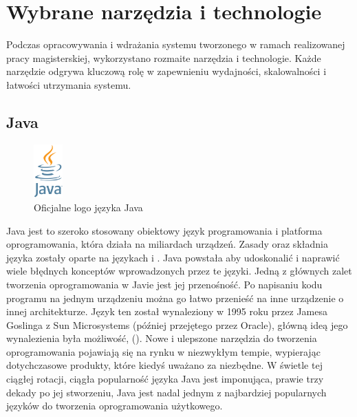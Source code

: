 \chapter{Wybrane narzędzia i technologie}


Podczas opracowywania i wdrażania systemu tworzonego w ramach realizowanej pracy magisterskiej,  wykorzystano rozmaite narzędzia i technologie. Każde narzędzie odgrywa kluczową rolę w zapewnieniu wydajności, skalowalności i łatwości utrzymania systemu.

\section{Java}

\begin{figure}[!htbp]
    \centering
    \includegraphics[width=0.1\textwidth]{images/javaLogo.png}
    \caption{Oficjalne logo języka Java}
    \label{fig:enter-label}
\end{figure}

Java jest to szeroko stosowany obiektowy język programowania i platforma oprogramowania, która działa na miliardach urządzeń. Zasady oraz składnia języka zostały oparte na językach  i \cite{javaIBM}\cite{cstandard}\cite{cppstandard}. Java powstała aby udoskonalić i naprawić wiele błędnych konceptów wprowadzonych przez te języki. Jedną z głównych zalet tworzenia oprogramowania w Javie jest jej przenośność. Po napisaniu kodu programu na jednym urządzeniu można go łatwo przenieść na inne urządzenie o innej architekturze. Język ten został wynaleziony w 1995 roku przez Jamesa Goslinga z Sun Microsystems (później przejętego przez Oracle), główną ideą jego wynalezienia była możliwość,   (). Nowe i ulepszone narzędzia do tworzenia oprogramowania pojawiają się na rynku w niezwykłym tempie, wypierając dotychczasowe produkty, które kiedyś uważano za niezbędne. W świetle tej ciągłej rotacji, ciągła popularność języka Java jest imponująca, prawie trzy dekady po jej stworzeniu, Java jest nadal jednym z najbardziej popularnych języków do tworzenia oprogramowania użytkowego\cite{javaIBM}\cite{javaDEV}.

